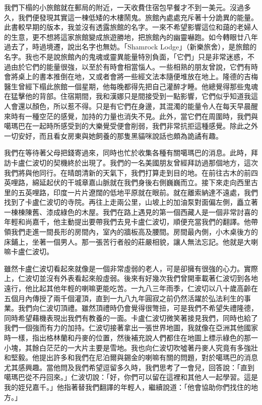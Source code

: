 我們下榻的小旅館就在郵局的附近，一天收費住宿包早餐才不到一美元。沒過多久，我們便發現其實這一棟低矮的木樓鬧鬼。旅館內處處充斥著十分詭異的能量。此書較早期的版本，我並沒有透露旅館的名字。一來不希望影響這位和藹的老婦人的生意，更不想將這家旅館變成旅遊勝地，把旅館內的幽靈嚇跑。如今轉眼廿八年過去了，時過境遷，說出名字也無妨。「Shamrock
Lodge」（新樂旅舍），是旅館的名字。我也不是說旅館內的鬼魂或靈異能量特別負面，「它們」只是非常迷惑，不過由於它們的能量很強，以至於有時會相當惱人。一些相熟的朋友曾說，它們有時會將桌上的書本推倒在地，又或者會將一些經文法本隨便堆放在地上。隆德的吉梅醫生曾經下榻此旅館一個星期，他每晚都得先把自己灌醉才睡。他總覺得那些鬼魂在猛擊他的背部。住宿期間，我和漢娜只是間接受到一點影響，它們似乎知道我這人會還以顏色，所以惹不得。只是有它們在身邊，其混濁的能量令人在每天早晨醒來時有一種空茫的感覺，加持的力量也消失不見。此外，當它們在周圍時，我們與噶瑪巴在一起時所感受到的大樂覺受便會削弱，我們非常抗拒這種感覺。除此之外一切安好，而且看女房東與她飼養的那隻黑貓咪說話也頗為詭譎有趣。

我們在等待著父母把錢寄過來，同時也忙於收集各種有關噶瑪巴的消息。此時，拜訪卡盧仁波切的契機終於出現了。我們的一名美國朋友曾經拜訪過那個地方，這次我們將與他同行。在晴朗清新的天氣下，我們打算走到目的地。在前往古木的前四英哩路，綿延起伏的干城章嘉山脈就在我們身後右側巍巍而立。接下來走向西里古里的五英哩路，印度一片片遼闊的低地平原就在眼前。就在離索納達不遠處，我們找到了卡盧仁波切的寺院。再往上走兩公里，山坡上的加油泵對面偏左側，矗立著一棟棟陳舊、漆成綠色的木屋。我們在路上遇見的第一個西藏人是一個非常討喜的年輕和尚嘉千，他主動提出要帶我們去見卡盧仁波切，順便充當我們的翻譯。他帶領我們走進一間長形的房間內，室內的牆板高及腰間。房間最內側，小木桌後方的床鋪上，坐著一個男人。那一張苦行者般的莊嚴相貌，讓人無法忘記。他就是大喇嘛卡盧仁波切。

雖然卡盧仁波切看起來就像是一個非常虛弱的老人，可是卻擁有很強的心力。實際上，仁波切並沒有外表看起來般虛弱。後來有好幾次我們曾開車載著仁波切到各地遠行，他比起其他年輕的喇嘛更能吃苦。一九八三年雨季，仁波切以八十歲高齡在五個月內傳授了兩千個灌頂，直到一九八九年圓寂之前仍然活躍於弘法利生的事業。我們向仁波切頂禮。雖然頂禮時仍會覺得很彆扭，可是我們不希望失禮隆德，同時希望藉機表現出我們有教養的一面。卡盧仁波切微笑著接見我們，同時也給了我們一個強而有力的加持。仁波切接著拿出一張世界地圖，我就像在亞洲其他國家時一樣，指出格林蘭和丹麥的位置，然後補充說人們都住在地圖上標示綠色的那一小塊，其餘白茫茫的一大片主要是雪地。我也向仁波切吹噓著丹麥人究竟有多強壯和堅毅。他提出許多和我們在尼泊爾與錫金的喇嘛有關的問題，對於噶瑪巴的消息尤其感興趣。當他問及我們希望逗留多久時，我們思考了一會兒，回答說：「直到噶瑪巴從不丹回來。」仁波切說：「好，你們可以留在這裡和其他人一起學習。這是我的姪兒嘉千。」他指著替我們翻譯的年輕人，繼續說道：「他會協助你們找住的地方。」

